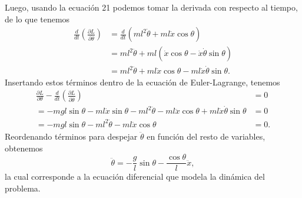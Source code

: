 \documentclass[
  11pt,
  letterpaper,
   addpoints,
   answers
  ]{exam}
\begin{document}
\begin{questions}
\begin{solution}
Luego, usando la ecuación 21 podemos tomar la derivada con respecto al tiempo, de lo que tenemos
\begin{align}
    \frac{d}{dt} \left( \frac{\partial L}{\partial \dot{\theta}} \right) 
    &= \frac{d}{dt} \left( ml^2 \dot{\theta} + ml \dot{x} \cos \theta \right) \tag{22}\\
    &= ml^2 \ddot{\theta} + ml \left( \dot{x} \cos \theta - \dot{x} \dot{\theta} \sin \theta \right)\\
    &= ml^2 \ddot{\theta} + ml \dot{x} \cos \theta - ml \dot{x} \dot{\theta} \sin \theta. \tag{23}
\end{align}
Insertando estos términos dentro de la ecuación de Euler-Lagrange, tenemos
\begin{align}
    \frac{\partial L}{\partial \theta} - \frac{d}{dt} \left( \frac{\partial L}{\partial \dot{\theta}} \right) &= 0 \tag{26}\\
    = -mgl \sin \theta - ml \dot{x} \sin \theta - ml^2 \ddot{\theta} - ml \ddot{x} \cos \theta + ml \dot{x} \dot{\theta} \sin \theta &= 0 \tag{27}\\
    = -mgl \sin \theta - ml^2 \ddot{\theta} - ml \ddot{x} \cos \theta &= 0. \tag{28}
\end{align}
Reordenando términos para despejar \(\ddot{\theta}\) en función del resto de variables, obtenemos
\begin{equation}
    \ddot{\theta} = -\frac{g}{l} \sin \theta - \frac{\cos \theta}{l} \ddot{x}, \tag{29}
\end{equation}
la cual corresponde a la ecuación diferencial que modela la dinámica del problema.

\end{solution}
\end{questions}
\end{document}
